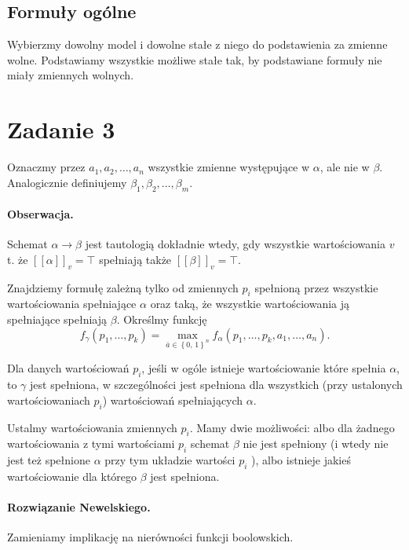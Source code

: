\subsection*{Formuły ogólne} Wybierzmy dowolny model i dowolne stałe z niego do podstawienia za zmienne wolne. Podstawiamy wszystkie możliwe stałe tak, by podstawiane formuły nie miały zmiennych wolnych. 

\section*{Zadanie 3}

Oznaczmy przez \( a_1, a_2, \ldots, a_n \) wszystkie zmienne występujące w \( \alpha \), ale nie w \( \beta \). Analogicznie definiujemy \( \beta_1, \beta_2, \ldots, \beta_m \). 

\paragraph{Obserwacja.} Schemat \( \alpha \to \beta \) jest tautologią dokładnie wtedy, gdy wszystkie wartościowania \( v \) t. że \( [[\alpha ]]_v = \top \) spełniają także \( [[\beta ]]_v = \top\).

Znajdziemy formułę zależną tylko od zmiennych \( p_i \) spełnioną przez wszystkie wartościowania spełniające \( \alpha \) oraz taką, że wszystkie wartościowania ją spełniające spełniają \( \beta \). Określmy funkcję
\[ 
    f_\gamma (p_1, \ldots, p_k) = \max\limits_{\overline{a} \in \left\{ 0,\, 1 \right\}^n } f_\alpha(p_1, \ldots, p_k, a_1, \ldots, a_n).
\]

Dla danych wartościowań \( p_i \), jeśli w ogóle istnieje wartościowanie które spełnia \( \alpha \), to \( \gamma \) jest spełniona, w szczególności jest spełniona dla wszystkich (przy ustalonych wartościowaniach \( p_i \)) wartościowań spełniających \( \alpha \).

Ustalmy wartościowania zmiennych \( p_i \). Mamy dwie możliwości: albo dla żadnego wartościowania z tymi wartościami \( p_i \) schemat \( \beta \) nie jest spełniony (i wtedy nie jest też spełnione \( \alpha \) przy tym układzie wartości \( p_i \) ), albo istnieje jakieś wartościowanie dla którego \( \beta \) jest spełniona.


\paragraph{Rozwiązanie Newelskiego.} Zamieniamy implikację na nierówności funkcji boolowskich.

